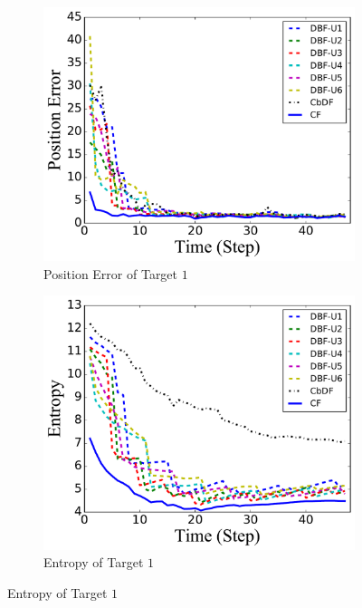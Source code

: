 	
	\begin{figure}%
		\centering
		\begin{subfigure}[b]{0.23\textwidth}
			\includegraphics[width=\textwidth]{figures/hetero_mov_sen_mov_tar_pos_err_noise_linear}
			\caption{Position Error of Target $1$}\label{fig:lin_pos_err}
		\end{subfigure}				
		\begin{subfigure}[b]{0.23\textwidth}
			\includegraphics[width=\textwidth]{figures/hetero_mov_sen_mov_tar_entropy_noise_linear}
			\caption{Entropy of Target $1$}\label{fig:lin_ent}

\end{subfigure}
\end{figure}

